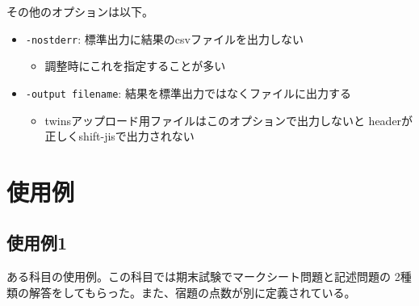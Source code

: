 その他のオプションは以下。

\begin{itemize}
\item \texttt{-nostderr}: 標準出力に結果のcsvファイルを出力しない

\begin{itemize}
\item 調整時にこれを指定することが多い

\end{itemize}

\item \texttt{-output filename}: 結果を標準出力ではなくファイルに出力する

\begin{itemize}
\item twinsアップロード用ファイルはこのオプションで出力しないと
headerが正しくshift-jisで出力されない

\end{itemize}

\end{itemize}

\section{使用例}
\label{使用例}

\subsection{使用例1}
\label{使用例1}

ある科目の使用例。この科目では期末試験でマークシート問題と記述問題の
2種類の解答をしてもらった。また、宿題の点数が別に定義されている。

